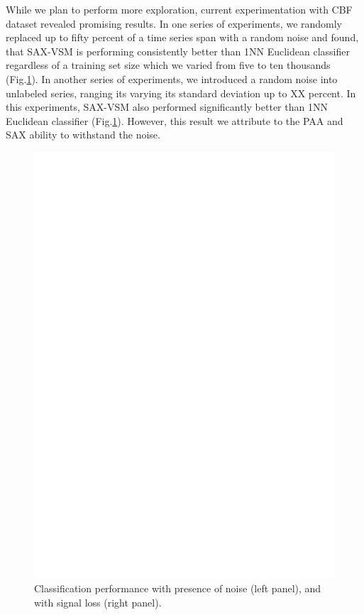 \documentclass{llncs}
\newcommand{\myfigureshrinker}{\vspace{-1cm}}
\begin{document}
While we plan to perform more exploration, current experimentation with CBF dataset revealed 
promising results. In one series of experiments, we randomly replaced up to fifty percent of a
time series span with a random noise and found, that SAX-VSM is performing consistently better 
than 1NN Euclidean classifier regardless of a training set size which we varied from five to
ten thousands (Fig.\ref{fig:corrupted}). 
In another series of experiments, we introduced a random noise into unlabeled
series, ranging its varying its standard deviation up to XX percent. In this experiments, SAX-VSM
also performed significantly better than 1NN Euclidean classifier (Fig.\ref{fig:corrupted}). 
However, this result we attribute to the PAA and SAX ability to withstand the noise.

\begin{figure}[t]
  \myfigureshrinker
  \centering
  \includegraphics[width=115mm]{figures/corrupted.ps}
  \caption{Classification performance with presence of noise
 (left panel), and with signal loss (right panel).}
  \label{fig:corrupted}
\end{figure}
\end{document}

